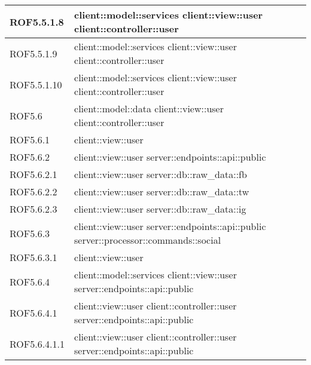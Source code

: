 \begin{center}
\begin{longtable}{| p{4cm} | p{8cm} |}
\hline
ROF5.5.1.8 & client::model::services \newline client::view::user \newline client::controller::user \\
\hline
ROF5.5.1.9 & client::model::services \newline client::view::user \newline client::controller::user \\
\hline
ROF5.5.1.10 & client::model::services \newline client::view::user \newline client::controller::user \\
\hline
ROF5.6 & client::model::data \newline client::view::user \newline client::controller::user \\
\hline
ROF5.6.1 & client::view::user \\
\hline
ROF5.6.2 & client::view::user \newline server::endpoints::api::public \\
\hline
ROF5.6.2.1 & client::view::user \newline server::db::raw\_data::fb \\
\hline
ROF5.6.2.2 & client::view::user \newline server::db::raw\_data::tw \\
\hline
ROF5.6.2.3 & client::view::user \newline server::db::raw\_data::ig \\
\hline
ROF5.6.3 & client::view::user \newline server::endpoints::api::public \newline server::processor::commands::social \\
\hline
ROF5.6.3.1 & client::view::user \\
\hline
ROF5.6.4 & client::model::services \newline client::view::user \newline server::endpoints::api::public \\
\hline
ROF5.6.4.1 & client::view::user \newline client::controller::user \newline server::endpoints::api::public \\
\hline
ROF5.6.4.1.1 & client::view::user \newline client::controller::user \newline server::endpoints::api::public \\

\end{longtable}
\end{center}
